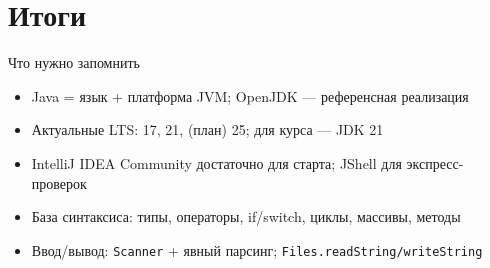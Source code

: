 \documentclass[aspectratio=169]{beamer}
\begin{document}
\section{Итоги}

\begin{frame}{Что нужно запомнить}
  \begin{itemize}
    \item Java = язык + платформа JVM; OpenJDK — референсная реализация
    \item Актуальные LTS: 17, 21, (план) 25; для курса — JDK 21
    \item IntelliJ IDEA Community достаточно для старта; JShell для экспресс-проверок
    \item База синтаксиса: типы, операторы, if/switch, циклы, массивы, методы
    \item Ввод/вывод: \texttt{Scanner} + явный парсинг; \texttt{Files.readString/writeString}
  \end{itemize}
\end{frame}
\end{document}
